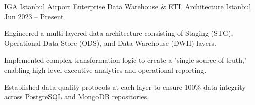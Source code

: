 \begin{cventries}
  \cventry
    {IGA Istanbul Airport} %
    {Enterprise Data Warehouse \& ETL Architecture} %
    {Istanbul} %
    {Jun 2023 – Present} %
    {
      \begin{cvitems} %
        \item {Engineered a multi-layered data architecture consisting of Staging (STG), Operational Data Store (ODS), and Data Warehouse (DWH) layers.}
        \item {Implemented complex transformation logic to create a "single source of truth," enabling high-level executive analytics and operational reporting.}
        \item {Established data quality protocols at each layer to ensure 100\% data integrity across PostgreSQL and MongoDB repositories.}
      \end{cvitems}
    }
\newline
\newline
\end{cventries}